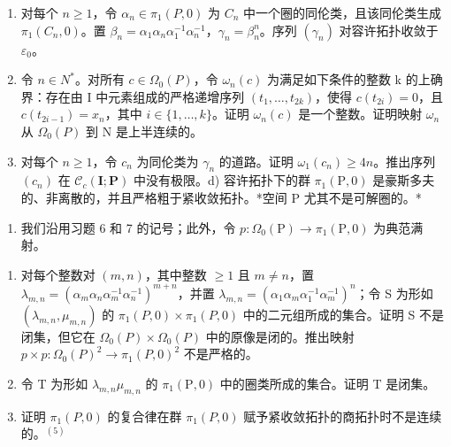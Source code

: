 \begin{enumerate}
\def\labelenumi{\alph{enumi})}
\item
  对每个 \(n \geqslant 1\)，令 \(\alpha_{n} \in \pi_{1}(P,0)\) 为 \(C_{n}\) 中一个圈的同伦类，且该同伦类生成 \(\pi_{1}(C_{n},0)\)。置 \(\beta_{n} = \alpha_{1}\alpha_{n}\alpha_{1}^{-1}\alpha_{n}^{-1}\)，\(\gamma_{n} = \beta_{n}^{n}\)。序列 \((\gamma_{n})\) 对容许拓扑收敛于 \(\varepsilon_{0}\)。
\item
  令 \(n \in N^{*}\)。对所有 \(c \in \Omega_{0}(P)\)，令 \(\omega_{n}(c)\) 为满足如下条件的整数 k 的上确界：存在由 I 中元素组成的严格递增序列 \((t_{1}, \ldots, t_{2k})\)，使得 \(c(t_{2i}) = 0\)，且 \(c(t_{2i-1}) = x_{n}\)，其中 \(i \in \{1, \ldots, k\}\)。证明 \(\omega_{n}(c)\) 是一个整数。证明映射 \(\omega_{n}\) 从 \(\Omega_{0}(P)\) 到 N 是上半连续的。
\item
  对每个 \(n \geqslant 1\)，令 \(c_{n}\) 为同伦类为 \(\gamma_{n}\) 的道路。证明 \(\omega_{1}(c_{n}) \geqslant 4n\)。推出序列 \((c_{n})\) 在 \(\mathcal{C}_{c}(\mathbf{I};\mathbf{P})\) 中没有极限。d) 容许拓扑下的群 \(\pi_{1}(\mathrm{P},0)\) 是豪斯多夫的、非离散的，并且严格粗于紧收敛拓扑。*空间 P 尤其不是可解圈的。*
\end{enumerate}

\begin{enumerate}
\def\labelenumi{\arabic{enumi})}
\setcounter{enumi}{7}
\tightlist
\item
  我们沿用习题 6 和 7 的记号；此外，令 \(p\colon \Omega_{0}(\mathrm{P})\to\pi_1(\mathrm{P},0)\) 为典范满射。
\end{enumerate}

\begin{enumerate}
\def\labelenumi{\alph{enumi})}
\item
  对每个整数对 \((m,n)\)，其中整数 \(\geqslant 1\) 且 \(m \neq n\)，置 \(\lambda_{m,n} = (\alpha_{m}\alpha_{n}\alpha_{m}^{-1}\alpha_{n}^{-1})^{m+n}\)，并置 \(\lambda_{m,n} = (\alpha_{1}\alpha_{m}\alpha_{1}^{-1}\alpha_{m}^{-1})^{n}\)；令 S 为形如 \((\lambda_{m,n},\mu_{m,n})\) 的 \(\pi_{1}(P,0)\times\pi_{1}(P,0)\) 中的二元组所成的集合。证明 S 不是闭集，但它在 \(\Omega_{0}(P)\times\Omega_{0}(P)\) 中的原像是闭的。推出映射 \(p\times p\colon\Omega_{0}(P)^{2}\to\pi_{1}(P,0)^{2}\) 不是严格的。
\item
  令 T 为形如 \(\lambda_{m,n}\mu_{m,n}\) 的 \(\pi_1(\mathrm{P},0)\) 中的圈类所成的集合。证明 T 是闭集。
\item
  证明 \(\pi_{1}(P,0)\) 的复合律在群 \(\pi_{1}(P,0)\) 赋予紧收敛拓扑的商拓扑时不是连续的。\(^{(5)}\)
\end{enumerate}

